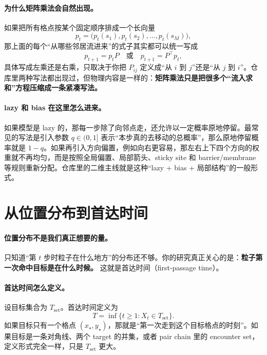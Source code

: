 \documentclass[11pt,fontset=fandol]{ctexart}
\begin{document}
\paragraph{为什么矩阵乘法会自然出现。}
如果把所有格点按某个固定顺序排成一个长向量
\[
  p_t = \bigl(p_t(s_1),p_t(s_2),\dots,p_t(s_M)\bigr),
\]
那上面的每个“从哪些邻居流进来”的式子其实都可以统一写成
\begin{equation}
  p_{t+1}=p_t P
  \quad\text{或}\quad
  p_{t+1}=P^\top p_t,
  \label{eq:matrix-evolution}
\end{equation}
具体写成左乘还是右乘，只取决于你把 $P_{ij}$ 定义成“从 $i$ 到 $j$”还是“从 $j$ 到 $i$”。仓库里两种写法都出现过，但物理内容是一样的：\textbf{矩阵乘法只是把很多个“流入求和”方程压缩成一条紧凑写法。}

\paragraph{lazy 和 bias 在这里怎么进来。}
如果模型是 lazy 的，那每一步除了向邻点走，还允许以一定概率原地停留。最常见的写法是引入参数 $q\in(0,1]$ 表示“本步真的去移动的总概率”，那么原地停留概率就是 $1-q$。如果再引入方向偏置，例如向右更容易，那左右上下四个方向的权重就不再均匀，而是按照全局偏置、局部箭头、sticky site 和 barrier/membrane 等规则重新分配。仓库里的二维主线就是这种“lazy + bias + 局部结构”的一般形式。

\section{从位置分布到首达时间}
\paragraph{位置分布不是我们真正想要的量。}
只知道“第 $t$ 步时粒子在什么地方”的分布还不够。你的研究真正关心的是：\textbf{粒子第一次命中目标是在什么时候。} 这就是首达时间（first-passage time）。

\paragraph{首达时间怎么定义。}
设目标集合为 $T_{\mathrm{set}}$。首达时间定义为
\begin{equation}
  T
  =
  \inf\{t\ge 1: X_t\in T_{\mathrm{set}}\}.
  \label{eq:fpt-def}
\end{equation}
如果目标只有一个格点 $(x_\star,y_\star)$，那就是“第一次走到这个目标格点的时刻”。如果目标是一条对角线、两个 target 的并集，或者 pair chain 里的 encounter set，定义形式完全一样，只是 $T_{\mathrm{set}}$ 更大。
\end{document}
